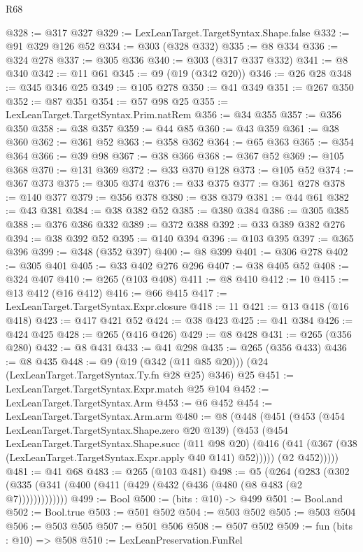 \begin{lexlean}{R68}
\begin{coremodule}
@328 := @317 @327
@329 := LexLeanTarget.TargetSyntax.Shape.false
@332 := @91 @329 @126 @52
@334 := @303 (@328 @332)
@335 := @8 @334
@336 := @324 @278
@337 := @305 @336
@340 := @303 (@317 @337 @332)
@341 := @8 @340
@342 := @11 @61
@345 := @9 (@19 (@342 @20))
@346 := @26 @28
@348 := @345 @346 @25
@349 := @105 @278
@350 := @41 @349
@351 := @267 @350
@352 := @87 @351
@354 := @57 @98 @25
@355 := LexLeanTarget.TargetSyntax.Prim.natRem
@356 := @34 @355
@357 := @356 @350
@358 := @38 @357
@359 := @44 @85
@360 := @43 @359
@361 := @38 @360
@362 := @361 @52
@363 := @358 @362
@364 := @65 @363
@365 := @354 @364
@366 := @39 @98
@367 := @38 @366
@368 := @367 @52
@369 := @105 @368
@370 := @131 @369
@372 := @33 @370 @128
@373 := @105 @52
@374 := @367 @373
@375 := @305 @374
@376 := @33 @375
@377 := @361 @278
@378 := @140 @377
@379 := @356 @378
@380 := @38 @379
@381 := @44 @61
@382 := @43 @381
@384 := @38 @382 @52
@385 := @380 @384
@386 := @305 @385
@388 := @376 @386 @332
@389 := @372 @388
@392 := @33 @389 @382 @276
@394 := @38 @392 @52
@395 := @140 @394
@396 := @103 @395
@397 := @365 @396
@399 := @348 (@352 @397)
@400 := @8 @399
@401 := @306 @278
@402 := @305 @401
@405 := @33 @402 @276 @296
@407 := @38 @405 @52
@408 := @324 @407
@410 := @265 (@103 @408)
@411 := @8 @410
@412 := 10
@415 := @13 @412 (@16 @412)
@416 := @66 @415
@417 := LexLeanTarget.TargetSyntax.Expr.closure
@418 := 11
@421 := @13 @418 (@16 @418)
@423 := @417 @421 @52
@424 := @38 @423
@425 := @41 @384
@426 := @424 @425
@428 := @265 (@416 @426)
@429 := @8 @428
@431 := @265 (@356 @280)
@432 := @8 @431
@433 := @41 @298
@435 := @265 (@356 @433)
@436 := @8 @435
@448 := @9 (@19 (@342 (@11 @85 @20))) (@24 (LexLeanTarget.TargetSyntax.Ty.fn @28 @25) @346) @25
@451 := LexLeanTarget.TargetSyntax.Expr.match @25 @104
@452 := LexLeanTarget.TargetSyntax.Arm
@453 := @6 @452
@454 := LexLeanTarget.TargetSyntax.Arm.arm
@480 := @8
    (@448
      (@451
        (@453
          (@454 LexLeanTarget.TargetSyntax.Shape.zero @20 @139)
          (@453
            (@454
              LexLeanTarget.TargetSyntax.Shape.succ
              (@11 @98 @20)
              (@416 (@41 (@367 (@38 (LexLeanTarget.TargetSyntax.Expr.apply @40 @141) @52)))))
            (@2 @452)))))
@481 := @41 @68
@483 := @265 (@103 @481)
@498 := @5
    (@264 (@283 (@302 (@335 (@341 (@400 (@411 (@429 (@432 (@436 (@480 (@8 @483 (@2 @7)))))))))))))
@499 := Bool
@500 := (bits : @10) -> @499
@501 := Bool.and
@502 := Bool.true
@503 := @501 @502
@504 := @503 @502
@505 := @503 @504
@506 := @503 @505
@507 := @501 @506
@508 := @507 @502
@509 := fun (bits : @10) => @508
@510 := LexLeanPreservation.FunRel

\end{coremodule}
\end{lexlean}
